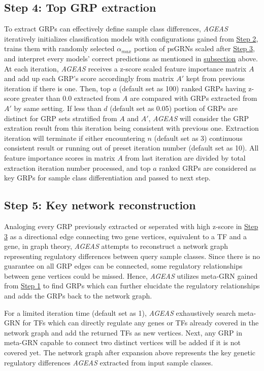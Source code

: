 \documentclass[fleqn,10pt]{wlscirep}
\begin{document}
  \subsection*{Step 4: Top GRP extraction}
    \label{step4}
    To extract GRPs can effectively define sample class differences, \emph{AGEAS} iteratively initializes classification models with configurations gained from \hyperref[step2]{Step 2}, trains them with randomly selected $\alpha_{max}$ portion of psGRNs scaled after \hyperref[step3]{Step 3}, and interpret every models' correct predictions as mentioned in \hyperref[features_importances]{subsection} above.
    At each iteration, \emph{AGEAS} receives a z-score scaled feature importance matrix $A$ and add up each GRP's score accordingly from matrix $A'$ kept from previous iteration if there is one.
    Then, top $a$ (default set as 100) ranked GRPs having z-score greater than $0.0$ extracted from $A$ are compared with GRPs extracted from $A'$ by same setting.
    If less than $d$ (default set as 0.05) portion of GRPs are distinct for GRP sets stratified from $A$ and $A'$, \emph{AGEAS} will consider the GRP extration result from this iteration being consistent with previous one.
    Extraction iteration will terminate if either encountering $n$ (default set as 3) continuous consistent result or running out of preset iteration number (default set as 10).
    All feature importance scores in matrix $A$ from last iteration are divided by total extraction iteration number processed, and top $a$ ranked GRPs are considered as key GRPs for sample class differentiation and passed to next step.

  \subsection*{Step 5: Key network reconstruction}
    \label{step5}
    Analoging every GRP previously extracted or seperated with high z-score in \hyperref[step3]{Step 3} as a directional edge connecting two gene vertices, equivalent to a TF and a gene, in graph theory, \emph{AGEAS} attempts to reconstruct a network graph representing regulatory differences between query sample classes.
    Since there is no guarantee on all GRP edges can be connected, some regulatory relationships between gene vertices could be missed.
    Hence, \emph{AGEAS} utilizes meta-GRN gained from \hyperref[step1]{Step 1} to find GRPs which can further elucidate the regulatory relationships and adds the GRPs back to the network graph.

    For a limited iteration time (default set as  1), \emph{AGEAS} exhaustively search meta-GRN for TFs which can directly regulate any genes or TFs already covered in the network graph and add the returned TFs as new vertices.
    Next, any GRP in meta-GRN capable to connect two distinct vertices will be added if it is not covered yet.
    The network graph after expansion above represents the key genetic regulatory differences \emph{AGEAS} extracted from input sample classes.
\end{document}
